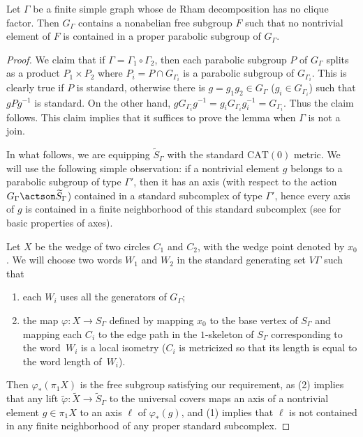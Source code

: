 \begin{prop}\label{prop:kim-koberda}
Let $\Gamma$ be a finite simple graph whose de Rham decomposition has no clique factor. Then $G_\Gamma$ contains a nonabelian free subgroup $F$ such that no nontrivial element of $F$ is contained in a proper parabolic subgroup of $G_\Gamma$.
\end{prop}
\begin{proof}
We claim that if $\Gamma=\Gamma_1\circ\Gamma_2$, then each parabolic subgroup $P$ of $G_\Gamma$ splits as a product $P_1\times P_2$ where $P_i=P\cap G_{\Gamma_i}$ is a parabolic subgroup of $G_{\Gamma_i}$. This is clearly true if $P$ is standard, otherwise there is $g=g_1g_2\in G_{\Gamma}$ ($g_i\in G_{\Gamma_i}$) such that $gPg^{-1}$ is standard. On the other hand, $gG_{\Gamma_i}g^{-1}=g_i G_{\Gamma_i} g^{-1}_i=G_{\Gamma_i}$. Thus the claim follows. This claim implies that it suffices to prove the lemma when $\Gamma$ is not a join.

In what follows, we are equipping $\widetilde{S}_\Gamma$ with the standard $\mathrm{CAT}(0)$ metric.
We will use the following simple observation: if a nontrivial element $g$ belongs to a parabolic subgroup of type $\Gamma'$, then it has an axis (with respect to the action $G_\Gamma\actson \widetilde{S}_\Gamma$) contained in a standard subcomplex of type $\Gamma'$, hence every axis of $g$ is contained in a finite neighborhood of this standard subcomplex (see \cite[Chap.\,II.6]{bridson2013metric} for basic properties of axes).


Let $X$ be the wedge of two circles $C_1$ and $C_2$, with the wedge point denoted by $x_0$. We will choose two words $W_1$ and $W_2$ in the standard generating set $V\Gamma$ such that
\begin{enumerate}
\item[(1)] each $W_i$ uses all the generators of $G_\Gamma$;
\item[(2)] the map $\varphi:X\to S_\Gamma$ defined by mapping $x_0$ to the base vertex of $S_\Gamma$ and mapping each $C_i$ to the edge path in the $1$-skeleton of $S_\Gamma$ corresponding to the word~$W_i$ is a local isometry ($C_i$ is metricized so that its length is equal to the word length of~$W_i$).
\end{enumerate}
Then $\varphi_\ast(\pi_1 X)$ is the free subgroup satisfying our requirement, as (2) implies that any lift $\tilde \varphi:\widetilde X\to \widetilde{S}_\Gamma$ to the universal covers maps an axis of a nontrivial element $g\in \pi_1 X$ to an axis $\ell$ of $\varphi_\ast(g)$, and (1) implies that $\ell$ is not contained in any finite neighborhood of any proper standard subcomplex.


\end{proof}
